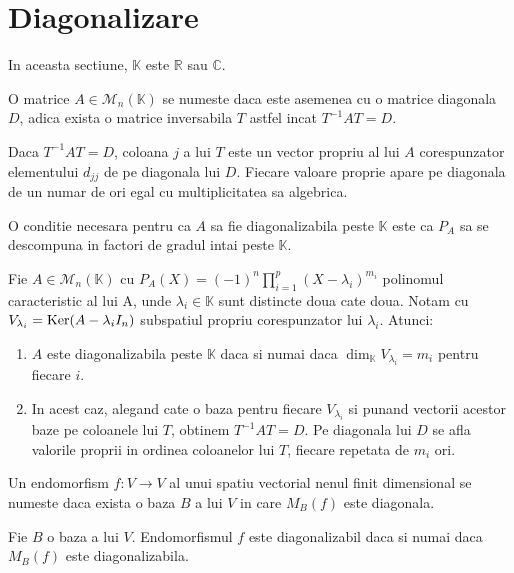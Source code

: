 \documentclass{article}
\begin{document}
\section{Diagonalizare}
\begin{enumerate}

  \observatie In aceasta sectiune, $\mathbb K$ este $\mathbb R$ sau $\mathbb C$.

   O matrice $A\in\mathcal M_n(\mathbb K)$ se numeste  daca este asemenea cu o matrice diagonala $D$, adica exista o matrice inversabila $T$ astfel incat $T^{-1}AT=D$.

  \proprietate Daca $T^{-1}AT=D$, coloana $j$ a lui $T$ este un vector propriu al lui $A$ corespunzator elementului $d_{jj}$ de pe diagonala lui $D$. Fiecare valoare proprie apare pe diagonala de un numar de ori egal cu multiplicitatea sa algebrica.

  \proprietate O conditie necesara pentru ca $A$ sa fie diagonalizabila peste $\mathbb K$ este ca $P_A$ sa se descompuna in factori de gradul intai peste $\mathbb K$.

  \begin{tcolorbox}
    \teorema Fie $A\in\mathcal M_n(\mathbb K)$ cu $P_A(X)=(-1)^n\prod_{i=1}^p(X-\lambda_i)^{m_i}$ polinomul caracteristic al lui A, unde $\lambda_i\in\mathbb K$ sunt distincte doua cate doua. Notam cu $V_{\lambda_i}=\operatorname{Ker}(A-\lambda_i I_n)$ subspatiul propriu corespunzator lui $\lambda_i$. Atunci:
    \begin{enumerate}
      \item $A$ este diagonalizabila peste $\mathbb K$ daca si numai daca $\dim_{\mathbb K}V_{\lambda_i}=m_i$ pentru fiecare $i$.
      \item In acest caz, alegand cate o baza pentru fiecare $V_{\lambda_i}$ si punand vectorii acestor baze pe coloanele lui $T$, obtinem $T^{-1}AT=D$. Pe diagonala lui $D$ se afla valorile proprii in ordinea coloanelor lui $T$, fiecare repetata de $m_i$ ori.
    \end{enumerate}
  \end{tcolorbox}

   Un endomorfism $f : V\to V$ al unui spatiu vectorial nenul finit dimensional se numeste  daca exista o baza $B$ a lui $V$ in care $M_B(f)$ este diagonala.

  \begin{tcolorbox}
    \teorema Fie $B$ o baza a lui $V$. Endomorfismul $f$ este diagonalizabil daca si numai daca $M_B(f)$ este diagonalizabila.
  \end{tcolorbox}


\end{enumerate}
\end{document}
